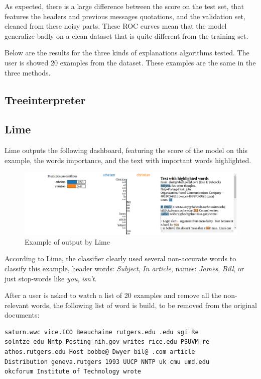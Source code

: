 \documentclass[a4paper,11pt]{kth-mag}
\begin{document}
As expected, there is a large difference between the score on the test set, that features the headers and previous messages quotations, and the validation set, cleaned from these noisy parts. These ROC curves mean that the model generalize badly on a clean dataset that is quite different from the training set.

Below are the results for the three kinds of explanations algorithms tested. The user is showed 20 examples from the dataset. These examples are the same in the three methods.

\subsection{Treeinterpreter}

\subsection{Lime}

Lime outputs the following dashboard, featuring the score of the model on this example, the words importance, and the text with important words highlighted.

\begin{figure}[!h]
	\centering
   	\def\svgwidth{\columnwidth}
	\includegraphics[scale=0.35]{lime-output.png}
    \caption{Example of output by Lime}
\end{figure}

According to Lime, the classifier clearly used several non-accurate words to classify this example, header words: \textit{Subject}, \textit{In article}, names: \textit{James}, \textit{Bill}, or just stop-words like \textit{you}, \textit{isn't}.

After a user is asked to watch a list of 20 examples and remove all the non-relevant words, the following list of word is build, to be removed from the original documents:

\begin{center}
\begin{verbatim}
saturn.wwc vice.ICO Beauchaine rutgers.edu .edu sgi Re
solntze edu Nntp Posting nih.gov writes rice.edu PSUVM re
athos.rutgers.edu Host bobbe@ Dwyer bil@ .com article
Distribution geneva.rutgers 1993 UUCP NNTP uk cmu umd.edu
okcforum Institute of Technology wrote
\end{verbatim}
\end{center}
\end{document}
